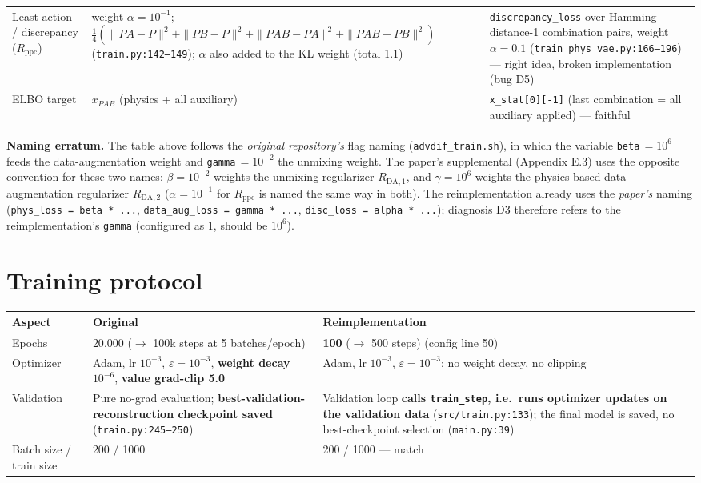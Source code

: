 \documentclass[11pt,a4paper]{article}
\newcommand{\code}[1]{\texttt{#1}}
\begin{document}
\begin{table}[h]
\begin{tabularx}{\textwidth}{LXX}
Least-action / discrepancy ($R_\mathrm{ppc}$) & weight $\alpha = 10^{-1}$; $\tfrac14(\|PA-P\|^2 + \|PB-P\|^2 + \|PAB-PA\|^2 + \|PAB-PB\|^2)$ (\code{train.py:142--149}); $\alpha$ also added to the KL weight (total 1.1) & \code{discrepancy\_loss} over Hamming-distance-1 combination pairs, weight $\alpha = 0.1$ (\code{train\_phys\_vae.py:166--196}) --- right idea, broken implementation (bug D5) \\
ELBO target & $x_{PAB}$ (physics + all auxiliary) & \code{x\_stat[0][-1]} (last combination = all auxiliary applied) --- faithful \\
\bottomrule
\end{tabularx}
\end{table}

\noindent\textbf{Naming erratum.} The table above follows the \emph{original
repository's} flag naming (\code{advdif\_train.sh}), in which the variable
\code{beta}$\,=10^6$ feeds the data-augmentation weight and
\code{gamma}$\,=10^{-2}$ the unmixing weight. The paper's supplemental
(Appendix E.3) uses the opposite convention for these two names: $\beta = 10^{-2}$
weights the unmixing regularizer $R_{\mathrm{DA},1}$, and $\gamma = 10^{6}$ weights
the physics-based data-augmentation regularizer $R_{\mathrm{DA},2}$
($\alpha = 10^{-1}$ for $R_\mathrm{ppc}$ is named the same way in both). The
reimplementation already uses the \emph{paper's} naming
(\code{phys\_loss = beta * ...}, \code{data\_aug\_loss = gamma * ...},
\code{disc\_loss = alpha * ...}); diagnosis D3 therefore refers to the
reimplementation's \code{gamma} (configured as 1, should be $10^6$).

\section{Training protocol}
\label{sec:protocol}

\begin{table}[h]
\centering
\small
\begin{tabularx}{\textwidth}{LXX}
\toprule
\textbf{Aspect} & \textbf{Original} & \textbf{Reimplementation} \\
\midrule
Epochs & 20{,}000 ($\to$ 100k steps at 5 batches/epoch) & \textbf{100} ($\to$ 500 steps) (config line 50) \\
Optimizer & Adam, lr $10^{-3}$, $\varepsilon = 10^{-3}$, \textbf{weight decay $10^{-6}$}, \textbf{value grad-clip 5.0} & Adam, lr $10^{-3}$, $\varepsilon = 10^{-3}$; no weight decay, no clipping \\
Validation & Pure no-grad evaluation; \textbf{best-validation-reconstruction checkpoint saved} (\code{train.py:245--250}) & Validation loop \textbf{calls \code{train\_step}, i.e.\ runs optimizer updates on the validation data} (\code{src/train.py:133}); the final model is saved, no best-checkpoint selection (\code{main.py:39}) \\
Batch size / train size & 200 / 1000 & 200 / 1000 --- match \\
\bottomrule
\end{tabularx}
\end{table}
\end{document}
